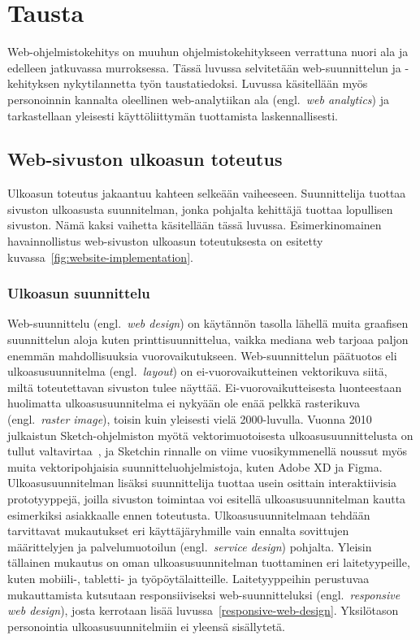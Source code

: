\documentclass[finnish, 12pt, a4paper, elec, utf8, a-1b, online]{aaltothesis}
\begin{document}
\clearpage
\section{Tausta}\label{background}

Web-ohjelmistokehitys on muuhun ohjelmistokehitykseen verrattuna nuori ala ja
edelleen jatkuvassa murroksessa. Tässä luvussa selvitetään web-suunnittelun ja
-kehityksen nykytilannetta työn taustatiedoksi. Luvussa käsitellään myös
personoinnin kannalta oleellinen web-analytiikan ala (engl.~\textit{web
analytics}) ja tarkastellaan yleisesti käyttöliittymän tuottamista
laskennallisesti.

\subsection{Web-sivuston ulkoasun toteutus}

Ulkoasun toteutus jakaantuu kahteen selkeään vaiheeseen. Suunnittelija tuottaa
sivuston ulkoasusta suunnitelman, jonka pohjalta kehittäjä tuottaa lopullisen
sivuston. Nämä kaksi vaihetta käsitellään tässä luvussa. Esimerkinomainen
havainnollistus web-sivuston ulkoasun toteutuksesta on esitetty
kuvassa~\ref{fig:website-implementation}.

\subsubsection{Ulkoasun suunnittelu}\label{background-web-design}

Web-suunnittelu (engl.~\textit{web design}) on käytännön tasolla lähellä muita
graafisen suunnittelun aloja kuten printtisuunnittelua, vaikka mediana web
tarjoaa paljon enemmän mahdollisuuksia vuorovaikutukseen. Web-suunnittelun
päätuotos eli ulkoasusuunnitelma (engl.~\textit{layout}) on ei-vuorovaikutteinen
vektorikuva siitä, miltä toteutettavan sivuston tulee näyttää.
Ei-vuorovaikutteisesta luonteestaan huolimatta ulkoasusuunnitelma ei nykyään ole
enää pelkkä rasterikuva (engl.~\textit{raster image}), toisin kuin yleisesti
vielä 2000-luvulla. Vuonna 2010 julkaistun Sketch-ohjelmiston myötä
vektorimuotoisesta ulkoasusuunnittelusta on tullut
valtavirtaa~\cite{webdesignmuseum_2022}, ja Sketchin rinnalle on viime
vuosikymmenellä noussut myös muita vektoripohjaisia suunnitteluohjelmistoja,
kuten Adobe XD ja Figma. Ulkoasusuunnitelman lisäksi suunnittelija tuottaa usein
osittain interaktiivisia prototyyppejä, joilla sivuston toimintaa voi esitellä
ulkoasusuunnitelman kautta esimerkiksi asiakkaalle ennen toteutusta.
Ulkoasusuunnitelmaan tehdään tarvittavat mukautukset eri käyttäjäryhmille vain
ennalta sovittujen määrittelyjen ja palvelumuotoilun (engl.~\textit{service
design}) pohjalta. Yleisin tällainen mukautus on oman ulkoasusuunnitelman
tuottaminen eri laitetyypeille, kuten mobiili-, tabletti- ja työpöytälaitteille.
Laitetyyppeihin perustuvaa mukauttamista kutsutaan responsiiviseksi
web-suunnitteluksi (engl.~\textit{responsive web design}), josta kerrotaan lisää
luvussa~\ref{responsive-web-design}. Yksilötason personointia
ulkoasusuunnitelmiin ei yleensä sisällytetä.
\end{document}

